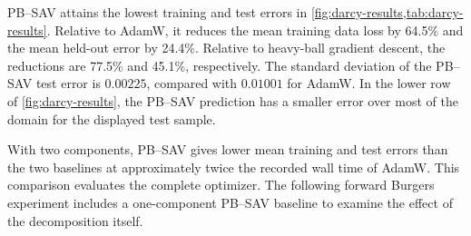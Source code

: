 PB--SAV attains the lowest training and test errors in
\cref{fig:darcy-results,tab:darcy-results}.  Relative to AdamW, it reduces the
mean training data loss by 64.5\% and the mean held-out error by 24.4\%.
Relative to heavy-ball gradient descent, the reductions are 77.5\% and
45.1\%, respectively.
The standard deviation of the PB--SAV test error is \(0.00225\), compared with
\(0.01001\) for AdamW.  In the lower row of \cref{fig:darcy-results}, the PB--SAV prediction has a
smaller error over most of the domain for the displayed test sample.

With two components, PB--SAV gives lower mean training and test errors than
the two baselines at approximately twice the recorded wall time of AdamW.
This comparison evaluates the complete optimizer. The following forward
Burgers experiment includes a one-component PB--SAV baseline to examine the
effect of the decomposition itself.
